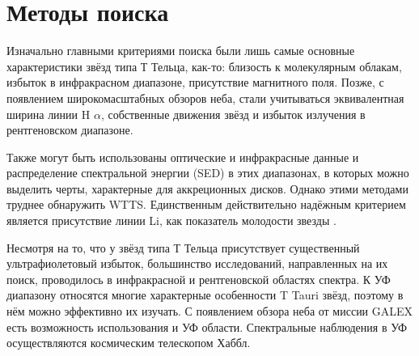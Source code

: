 

\section{Методы поиска}
 Изначально главными критериями поиска были лишь самые основные характеристики звёзд типа Т Тельца, как-то: близость к молекулярным облакам, избыток в инфракрасном диапазоне, присутствие магнитного поля. Позже, с появлением широкомасштабных обзоров неба, стали учитываться эквивалентная ширина линии H $\alpha$, собственные движения звёзд и избыток излучения в рентгеновском диапазоне.

Также могут быть использованы оптические и инфракрасные данные и распределение спектральной энергии (SED) в этих диапазонах, в которых можно выделить черты, характерные для аккреционных дисков. Однако этими методами труднее обнаружить WTTS. Единственным действительно надёжным критерием является присутствие линии Li, как показатель молодости звезды \cite{dod2013}.

Несмотря на то, что у звёзд типа Т Тельца присутствует существенный ультрафиолетовый избыток, большинство исследований, направленных на их поиск, проводилось в инфракрасной и рентгеновской областях спектра. К УФ диапазону относятся многие характерные особенности T Tauri звёзд, поэтому в нём можно эффективно их изучать. С появлением обзора неба от миссии GALEX есть возможность использования и УФ области. Спектральные наблюдения в УФ осуществляются космическим телескопом Хаббл.



